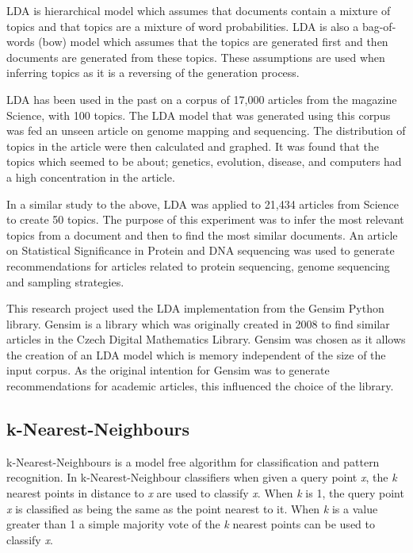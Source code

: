 LDA is hierarchical model which assumes that documents contain a mixture of topics and that topics are a mixture of word probabilities.
LDA is also a bag-of-words (bow) model which assumes that the topics are generated first and then documents are generated from these topics.
These assumptions are used when inferring topics as it is a reversing of the generation process\cite{LDAintro}.

LDA has been used in the past on a corpus of 17,000 articles from the magazine Science, with 100 topics.
The LDA model that was generated using this corpus was fed an unseen article on genome mapping and sequencing.
The distribution of topics in the article were then calculated and graphed.
It was found that the topics which seemed to be about; genetics, evolution, disease, and computers had a high concentration in the article\cite{ACMTopicModel}.

In a similar study to the above, LDA was applied to 21,434 articles from Science to create 50 topics.
The purpose of this experiment was to infer the most relevant topics from a document and then to find the most similar documents.
An article on Statistical Significance in Protein and DNA sequencing was used to generate recommendations for articles related to protein sequencing, genome sequencing and sampling strategies.

This research project used the LDA implementation from the Gensim Python library.
Gensim is a library which was originally created in 2008 to find similar articles in the Czech Digital Mathematics Library.
Gensim was chosen as it allows the creation of an LDA model which is memory independent of the size of the input corpus.
As the original intention for Gensim was to generate recommendations for academic articles, this influenced the choice of the library.\cite{rehurek_lrec}


\subsection{k-Nearest-Neighbours}
k-Nearest-Neighbours is a model free algorithm for classification and pattern recognition.
In k-Nearest-Neighbour classifiers when given a query point \textit{x}, the \textit{k} nearest points in distance to \textit{x} are used to classify \textit{x}.
When \textit{k} is 1, the query point \textit{x} is classified as being the same as the point nearest to it.
When \textit{k} is a value greater than 1 a simple majority vote of the \textit{k} nearest points can be used to classify \textit{x}.\cite{elementsStat}

